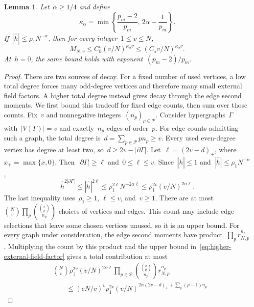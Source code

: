 \documentclass[letterpaper,11pt,reqno]{amsart}
\renewcommand{\leq}{\leqslant}
\renewcommand{\geq}{\geqslant}
\newcommand{\hh}{\hat{h}}
\newtheorem{lemma}[theorem]{Lemma}
\begin{document}
\begin{lemma}\label{lem:higher-support-mass}
Let~$\alpha\geq1/4$ and define
\begin{equation*}
\kappa_\alpha=\min\left\{\frac{p_m-2}{p_m},\,2\alpha-\frac1{p_m}\right\}.
\end{equation*}
If~$|\hh|\leq\rho_1N^{-\alpha}$, then for every integer~$1\leq v\leq N$,
\begin{equation}\label{eq:higher-support-mass}
M_{N,v}\leq C_0^v(v/N)^{\kappa_\alpha v}
\leq(C_\star v/N)^{\kappa_\alpha v}.
\end{equation}
At~$h=0$, the same bound holds with exponent~$(p_m-2)/p_m$.
\end{lemma}
\begin{proof}
There are two sources of decay. For a fixed number of used vertices, a low total degree forces many odd-degree vertices and therefore many small external field factors. A higher total degree instead gives decay through the edge second moments. We first bound this tradeoff for fixed edge counts, then sum over those counts. Fix~$v$ and nonnegative integers~$(n_p)_{p\in\mathcal P}$. Consider hypergraphs~$\Gamma$ with~$|V(\Gamma)|=v$ and exactly~$n_p$ edges of order~$p$. For edge counts admitting such a graph, the total degree is~$d=\sum_{p\in\mathcal P}pn_p\geq v$. Every used even-degree vertex has degree at least two, so~$d\geq2v-|\partial\Gamma|$. Let~$\ell=(2v-d)_+$, where~$x_+=\max\{x,0\}$. Then~$|\partial\Gamma|\geq\ell$ and~$0\leq\ell\leq v$. Since~$|\hh|\leq1$ and~$|\hh|\leq\rho_1N^{-\alpha}$,
\begin{equation}\label{eq:higher-external-field-factor}
\hh^{2|\partial\Gamma|}
\leq |\hh|^{2\ell}
\leq \rho_1^{2\ell}N^{-2\alpha\ell}
\leq \rho_1^{2v}(v/N)^{2\alpha\ell}.
\end{equation}
The last inequality uses~$\rho_1\geq1$, $\ell\leq v$, and~$v\geq1$.
There are at most~$\binom Nv\prod_p\binom{\binom vp}{n_p}$ choices of vertices and edges. This count may include edge selections that leave some chosen vertices unused, so it is an upper bound. For every graph under consideration, the edge second moments have product~$\prod_p r_{N,p}^{n_p}$. Multiplying the count by this product and the upper bound in~\eqref{eq:higher-external-field-factor} gives a total contribution at most
\begin{align*}
&\binom Nv\rho_1^{2v}(v/N)^{2\alpha\ell}
\prod_{p\in\mathcal P}\binom{\binom vp}{n_p}r_{N,p}^{n_p}\\
&\qquad\leq(eN/v)^v\rho_1^{2v}
(v/N)^{2\alpha(2v-d)_++\sum_p(p-1)n_p}

\end{align*}
\end{proof}
\end{document}
